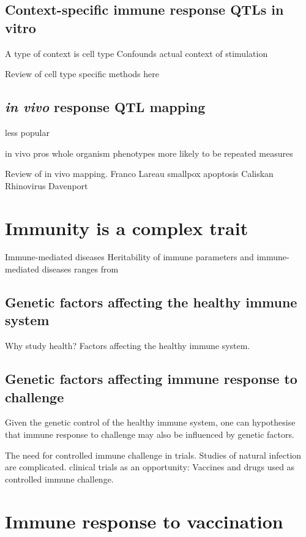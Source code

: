 \subsection{Context-specific immune response QTLs in vitro}

A type of context is cell type
Confounds actual context of stimulation

Review of cell type specific methods here

\subsection{\textit{in vivo} response QTL mapping}

less popular

in vivo pros
    whole organism phenotypes
    more likely to be repeated measures

Review of in vivo mapping.
Franco
Lareau smallpox apoptosis
Caliskan Rhinovirus
Davenport

\section{Immunity is a complex trait}
Immune-mediated diseases
Heritability of immune parameters and immune-mediated diseases
    ranges from 

\subsection{Genetic factors affecting the healthy immune system}

Why study health?
Factors affecting the healthy immune system.

\subsection{Genetic factors affecting immune response to challenge}

Given the genetic control of the healthy immune system, one can hypothesise that immune response to challenge may also be influenced by genetic factors.

The need for controlled immune challenge in trials.
Studies of natural infection are complicated.
clinical trials as an opportunity: 
    Vaccines and drugs used as controlled immune challenge.

\section{Immune response to vaccination}

